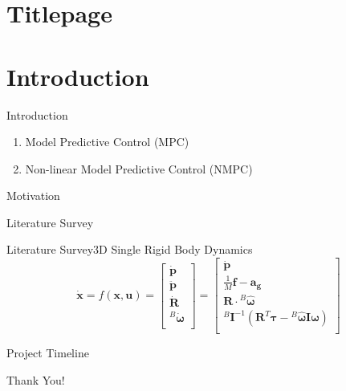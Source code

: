 \documentclass[handout]{beamer}
\begin{document}
\section*{Titlepage}
\begin{frame}\titlepage\end{frame}

\section{Introduction}
\begin{frame}{Introduction}
\begin{enumerate}
\item Model Predictive Control (MPC)
\item Non-linear Model Predictive Control (NMPC)
\end{enumerate}
\end{frame}

\begin{frame}{Motivation}

\end{frame}

\begin{frame}{Literature Survey}

\end{frame}

\begin{frame}{Literature Survey}{3D Single Rigid Body Dynamics}
\[
    \dot{\mathbf{x}} = f(\mathbf{x}, \mathbf{u})
    = \begin{bmatrix}
        \dot{\mathbf{p}} \\
        \ddot{\mathbf{p}} \\
        \dot{\mathbf{R}} \\
        {}^{B}\dot{\boldsymbol{\omega}} \\
    \end{bmatrix}
    = \begin{bmatrix}
        \dot{\mathbf{p}} \\
        \frac{1}{M}\mathbf{f} - \mathbf{a_g} \\
        \mathbf{R} \cdot {}^{B}\boldsymbol{\hat{\omega}} \\
        {}^{B}\mathbf{I}^{-1}(\mathbf{R}^T\boldsymbol{\tau} -  {}^{B}\boldsymbol{\hat{\omega}}\mathbf{I}\boldsymbol{\omega}) \\
    \end{bmatrix}
\]
\end{frame}

\begin{frame}{Project Timeline}

\end{frame}

\begin{frame}
    \LARGE{Thank You!}
\end{frame}
\end{document}
